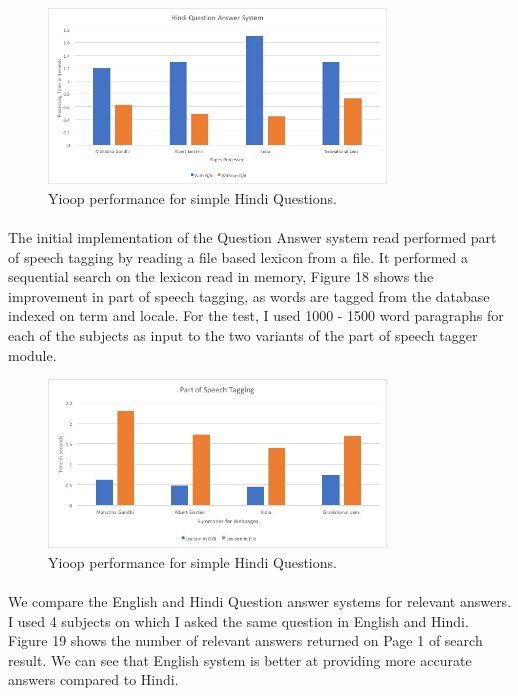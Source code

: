 \begin{figure}[htb]
\centering
\includegraphics[width=0.8\textwidth]{images/QA_performance1.jpg}
\caption{Yioop performance for simple Hindi Questions.} 
\label{fig:QA_performance1}
\end{figure}

\paragraph{}
The initial implementation of the Question Answer system read performed part of speech tagging by reading a file based lexicon from a file. It performed a sequential search on the lexicon read in memory, Figure 18 shows the improvement in part of speech tagging, as words are tagged from the database indexed on term and locale. For the test, I used 1000 - 1500 word paragraphs for each of the subjects as input to the two variants of the part of speech tagger module.

\begin{figure}[htb]
\centering
\includegraphics[width=0.8\textwidth]{images/QA_performance2.jpg}
\caption{Yioop performance for simple Hindi Questions.} 
\label{fig:QA_performance2}
\end{figure}
\break

\paragraph{}
We compare the English and Hindi Question answer systems for relevant answers. I used 4 subjects on which I asked the same question in English and Hindi. Figure 19 shows the number of relevant answers returned on Page 1 of search result. We can see that English system is better at providing more accurate answers compared to Hindi.

